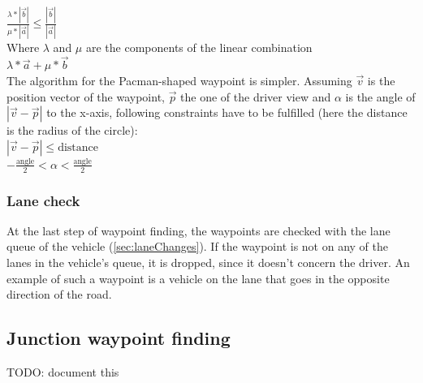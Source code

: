 $ \frac{\lambda * \left| \vec{b} \right| }{\mu * \left| \vec{a} \right|} \leq 
\frac{\left| \vec{b} \right|}{\left| \vec{a} \right|}$ \\

\noindent Where $\lambda$ and $\mu$ are the components of the linear combination \\

$ \lambda * \vec{a} + \mu * \vec{b} $ \\

The algorithm for the Pacman-shaped waypoint is simpler. Assuming
$\vec{v}$ is the position vector of the waypoint, $\vec{p}$ the
one of the driver view and $\alpha$ is the angle of $\left | \vec{v} -
\vec{p}\right|$ to the x-axis, following constraints have to be fulfilled
(here the distance is the radius of the circle): \\

$ \left| \vec{v} - \vec{p} \right| \leq \text{distance}$  \\

$ -\frac{\text{angle}}{2} < \alpha < \frac{\text{angle}}{2} $


\subsubsection{Lane check}

At the last step of waypoint finding, the waypoints are checked with the
lane queue of the vehicle (\ref{sec:laneChanges}). If the waypoint is not
on any of the lanes in the vehicle's queue, it is dropped, since it doesn't
concern the driver. An example of such a waypoint is a vehicle on the lane
that goes in the opposite direction of the road.


\subsection{Junction waypoint finding}
\label{sec:junctionWPfinding}

TODO: document this



